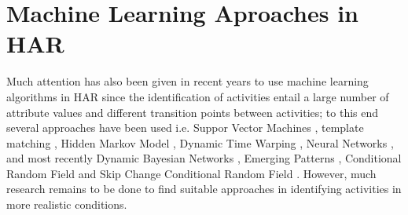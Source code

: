 \section{Machine Learning Aproaches in HAR}
Much attention has also been given in recent years to use machine learning 
algorithms in HAR since the identification of activities entail a large number of 
attribute values and different transition points between activities;
to this end several approaches have been used i.e. 
Suppor Vector Machines \cite{J.FrankS.Mannor2010, Sama2013, Schuldt2004},
template matching \cite{Nguyen2009,Lin2007}, 
Hidden Markov Model 
\cite{Kohn2012,Niu2004,Chen2003,Bernardin2003,Eickeler1998,Chang2000},
Dynamic Time Warping \cite{Bautista2013,Boulgouris2004,Celebi2011},
Neural Networks \cite{Rosenblum1994,Ji2013,Modi2011,Boesnach2004},
and  most recently Dynamic Bayesian Networks \cite{Cuaya2013, Wang2014}, 
Emerging Patterns \cite{Tao2009, Kim2010},
Conditional Random Field  \cite{Wang2006} and
Skip Change Conditional Random Field \cite{Kim2010}. 
However, much research remains to be done to find suitable approaches 
in identifying activities in more realistic conditions.



